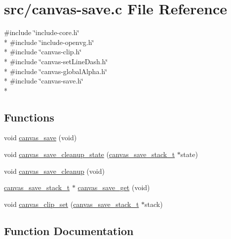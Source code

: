 \hypertarget{canvas-save_8c}{}\section{src/canvas-\/save.c File Reference}
\label{canvas-save_8c}
{\ttfamily \#include \char`\"{}include-\/core.\+h\char`\"{}}\\*
{\ttfamily \#include \char`\"{}include-\/openvg.\+h\char`\"{}}\\*
{\ttfamily \#include \char`\"{}canvas-\/clip.\+h\char`\"{}}\\*
{\ttfamily \#include \char`\"{}canvas-\/set\+Line\+Dash.\+h\char`\"{}}\\*
{\ttfamily \#include \char`\"{}canvas-\/global\+Alpha.\+h\char`\"{}}\\*
{\ttfamily \#include \char`\"{}canvas-\/save.\+h\char`\"{}}\\*
\subsection*{Functions}
\begin{DoxyCompactItemize}
\item 
void \hyperlink{canvas-save_8c_ae82cc37b7b2b1c9148a08032a0c7cc40}{canvas\+\_\+save} (void)
\item 
void \hyperlink{canvas-save_8c_ad66c58baf950803e925aff072d137d66}{canvas\+\_\+save\+\_\+cleanup\+\_\+state} (\hyperlink{structcanvas__save__stack__t}{canvas\+\_\+save\+\_\+stack\+\_\+t} $\ast$state)
\item 
void \hyperlink{canvas-save_8c_a2e0a1c92b277e1ba569f0c1a6d2eb093}{canvas\+\_\+save\+\_\+cleanup} (void)
\item 
\hyperlink{structcanvas__save__stack__t}{canvas\+\_\+save\+\_\+stack\+\_\+t} $\ast$ \hyperlink{canvas-save_8c_af7ed9425b815c74e76980a76480f31c4}{canvas\+\_\+save\+\_\+get} (void)
\item 
void \hyperlink{canvas-save_8c_acae2d5a3a4d792cb741cb1a46097ad56}{canvas\+\_\+clip\+\_\+set} (\hyperlink{structcanvas__save__stack__t}{canvas\+\_\+save\+\_\+stack\+\_\+t} $\ast$stack)
\end{DoxyCompactItemize}


\subsection{Function Documentation}
\hypertarget{canvas-save_8c_acae2d5a3a4d792cb741cb1a46097ad56}{}
